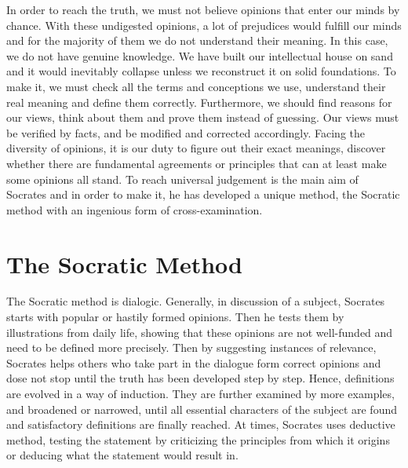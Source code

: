 \documentclass[11pt]{article}
\begin{document}
\begin{sloppypar}
In order to reach the truth, we must not believe opinions that enter our minds by chance. 
With these undigested opinions, a lot of prejudices would fulfill our minds and for the majority of them we do not understand their meaning. 
In this case, we do not have genuine knowledge. 
We have built our intellectual house on sand and it would inevitably collapse unless we reconstruct it on solid foundations. 
To make it, we must check all the terms and conceptions we use, understand their real meaning and define them correctly. 
Furthermore, we should find reasons for our views, think about them and prove them instead of guessing. 
Our views must be verified by facts, and be modified and corrected accordingly. 
Facing the diversity of opinions, it is our duty to figure out their exact meanings, discover whether there are fundamental agreements or principles that can at least make some opinions all stand. 
To reach universal judgement is the main aim of Socrates and in order to make it, he has developed a unique method, the Socratic method with an ingenious form of cross-examination.
  
\section{The Socratic Method}
The Socratic method is dialogic. 
Generally, in discussion of a subject, Socrates starts with popular or hastily formed opinions. 
Then he tests them by illustrations from daily life, showing that these opinions are not well-funded and need to be defined more precisely. 
Then by suggesting instances of relevance, Socrates helps others who take part in the dialogue form correct opinions and dose not stop until the truth has been developed step by step.
Hence, definitions are evolved in a way of induction. 
They are further examined by more examples, and broadened or narrowed, until all essential characters of the subject are found and satisfactory definitions are finally reached. 
At times, Socrates uses deductive method, testing the statement by criticizing the principles from which it origins or deducing what the statement would result in.

\par


\end{sloppypar}
\end{document}
